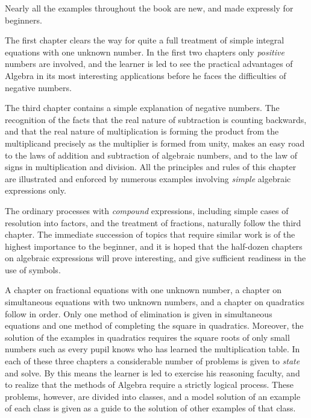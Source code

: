 \documentclass[12pt]{book}[2005/09/16]
\begin{document}
Nearly all the examples throughout the book are new,
and made expressly for beginners.

The first chapter clears the way for quite a full treatment
of simple integral equations with one unknown number.
In the first two chapters only \emph{positive} numbers are
involved, and the learner is led to see the practical advantages
of Algebra in its most interesting applications before
he faces the difficulties of negative numbers.

The third chapter contains a simple explanation of negative
numbers.  The recognition of the facts that the real
nature of subtraction is counting backwards, and that the
real nature of multiplication is forming the product from
the multiplicand precisely as the multiplier is formed from
unity, makes an easy road to the laws of addition and subtraction
of algebraic numbers, and to the law of signs in
multiplication and division.  All the principles and rules
of this chapter are illustrated and enforced by numerous
examples involving \emph{simple} algebraic expressions only.

The ordinary processes with \emph{compound} expressions, including
simple cases of resolution into factors, and the
treatment of fractions, naturally follow the third chapter.
The immediate succession of topics that require similar
work is of the highest importance to the beginner, and it
is hoped that the half-dozen chapters on algebraic expressions
will prove interesting, and give sufficient readiness
in the use of symbols.

A chapter on fractional equations with one unknown
number, a chapter on simultaneous equations with two
unknown numbers, and a chapter on quadratics follow in
order.  Only one method of elimination is given in simultaneous
equations and one method of completing the
square in quadratics.  Moreover, the solution of the examples
in quadratics requires the square roots of only small
numbers such as every pupil knows who has learned the
multiplication table.  In each of these three chapters a
considerable number of problems is given to \emph{state} and solve.
By this means the learner is led to exercise his reasoning
faculty, and to realize that the methods of Algebra require
a strictly logical process.  These problems, however, are
divided into classes, and a model solution of an example
of each class is given as a guide to the solution of other
examples of that class.
\end{document}
